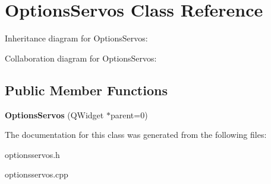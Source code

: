 \hypertarget{class_options_servos}{}\section{Options\+Servos Class Reference}
\label{class_options_servos}


Inheritance diagram for Options\+Servos\+:


Collaboration diagram for Options\+Servos\+:
\subsection*{Public Member Functions}
\begin{DoxyCompactItemize}
\item 
\hypertarget{class_options_servos_a7bb41f5698acc37739be335f582003bc}{}{\bfseries Options\+Servos} (Q\+Widget $\ast$parent=0)\label{class_options_servos_a7bb41f5698acc37739be335f582003bc}

\end{DoxyCompactItemize}


The documentation for this class was generated from the following files\+:\begin{DoxyCompactItemize}
\item 
optionsservos.\+h\item 
optionsservos.\+cpp\end{DoxyCompactItemize}
